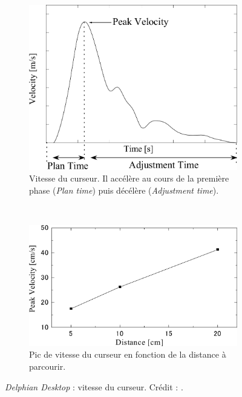 \begin{appendices}
	\begin{figure}[htbp]
		\begin{subfigure}[t]{0.44\textwidth}
			\centering
			\includegraphics[width=\textwidth]{figures/ch2/delphianPeak}
			\caption{Vitesse du curseur. Il accélère au cours de la première phase (\emph{Plan time}) puis décélère (\emph{Adjustment time}).}
			\label{fig:delphianPeak}
		\end{subfigure}
		~
		\begin{subfigure}[t]{0.54\textwidth}
			\centering
			\includegraphics[width=\textwidth]{figures/ch2/delphianSpeedDist}
			\caption{Pic de vitesse du curseur en fonction de la distance à parcourir.}
			\label{fig:delphianSpeedDist}
		\end{subfigure}
		\caption[\emph{Delphian Desktop} : vitesse du curseur]{\emph{Delphian Desktop} : vitesse du curseur. Crédit : \cite{asano2005predictive}.}
		\label{fig:delphianCursor}
	\end{figure}
	

\end{appendices}
